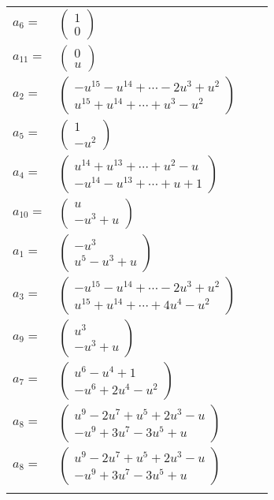 \documentclass[1p]{elsarticle_modified}
\theoremstyle{definition}
\begin{document}
\begin{tabular}{m{7pt} m{180pt} m{7pt} m{180pt} }
\flushright $a_{6}=$&$\begin{pmatrix}1\\0\end{pmatrix}$ \\
\flushright $a_{11}=$&$\begin{pmatrix}0\\u\end{pmatrix}$ \\
\flushright $a_{2}=$&$\begin{pmatrix}- u^{15}- u^{14}+\cdots-2 u^3+u^2\\u^{15}+u^{14}+\cdots+u^3- u^2\end{pmatrix}$ \\
\flushright $a_{5}=$&$\begin{pmatrix}1\\- u^2\end{pmatrix}$ \\
\flushright $a_{4}=$&$\begin{pmatrix}u^{14}+u^{13}+\cdots+u^2- u\\- u^{14}- u^{13}+\cdots+u+1\end{pmatrix}$ \\
\flushright $a_{10}=$&$\begin{pmatrix}u\\- u^3+u\end{pmatrix}$ \\
\flushright $a_{1}=$&$\begin{pmatrix}- u^3\\u^5- u^3+u\end{pmatrix}$ \\
\flushright $a_{3}=$&$\begin{pmatrix}- u^{15}- u^{14}+\cdots-2 u^3+u^2\\u^{15}+u^{14}+\cdots+4 u^4- u^2\end{pmatrix}$ \\
\flushright $a_{9}=$&$\begin{pmatrix}u^3\\- u^3+u\end{pmatrix}$ \\
\flushright $a_{7}=$&$\begin{pmatrix}u^6- u^4+1\\- u^6+2 u^4- u^2\end{pmatrix}$ \\
\flushright $a_{8}=$&$\begin{pmatrix}u^9-2 u^7+u^5+2 u^3- u\\- u^9+3 u^7-3 u^5+u\end{pmatrix}$\\ \flushright $a_{8}=$&$\begin{pmatrix}u^9-2 u^7+u^5+2 u^3- u\\- u^9+3 u^7-3 u^5+u\end{pmatrix}$\\&\end{tabular}
\end{document}
